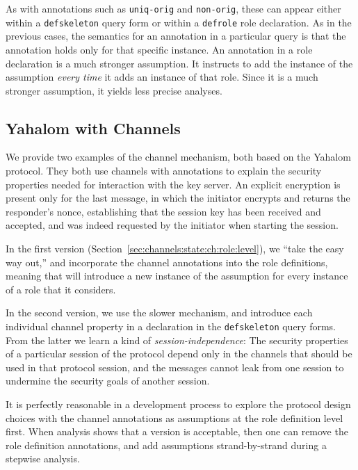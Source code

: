 As with annotations such as \verb|uniq-orig| and \verb|non-orig|,
these can appear either within a \verb|defskeleton| query form or
within a \verb|defrole| role declaration.  As in the previous cases,
the semantics for an annotation in a particular query is that the
annotation holds only for that specific instance.  An annotation in a
role declaration is a much stronger assumption.  It instructs {\cpsa}
to add the instance of the assumption \emph{every time} it adds an
instance of that role.  Since it is a much stronger assumption, it
yields less precise analyses.

\subsection{Yahalom with Channels}
\label{sec:channels:state:ch:yahalom}

We provide two examples of the channel mechanism, both based on the
Yahalom protocol.  They both use channels with annotations to explain
the security properties needed for interaction with the key server.
An explicit encryption is present only for the last message, in which
the initiator encrypts and returns the responder's nonce, establishing
that the session key has been received and accepted, and was indeed
requested by the initiator when starting the session.

In the first version (Section~\ref{sec:channels:state:ch:role:level}),
we ``take the easy way out,'' and incorporate the channel annotations
into the role definitions, meaning that {\cpsa} will introduce a new
instance of the assumption for every instance of a role that it
considers.

In the second version, we use the slower mechanism, and introduce each
individual channel property in a declaration in the \verb|defskeleton|
query forms.  From the latter we learn a kind of
\emph{session-independence\/}:  The security properties of a
particular session of the protocol depend only in the channels that
should be used in that protocol session, and the messages cannot leak
from one session to undermine the security goals of another session.

It is perfectly reasonable in a development process to explore the
protocol design choices with the channel annotations as assumptions at
the role definition level first.  When analysis shows that a version
is acceptable, then one can remove the role definition annotations,
and add assumptions strand-by-strand during a stepwise analysis.

